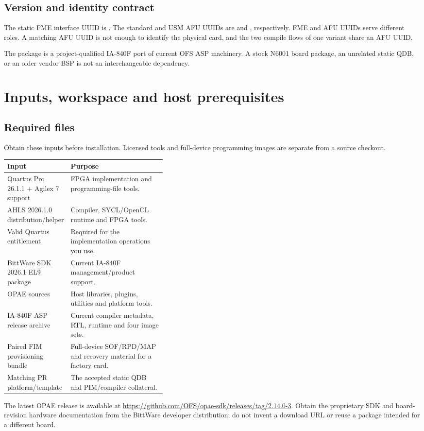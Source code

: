 \documentclass[11pt,letterpaper]{article}
\newcommand{\code}[1]{{\ttfamily\expandafter\seqsplit\expandafter{\detokenize{#1}}}}
\newcommand{\src}[1]{\cite{S#1}}
\newcommand{\chapterstart}[1]{\clearpage\section{#1}}
\begin{document}
\subsection{Version and identity contract}
The static FME interface UUID is
. The standard and USM AFU UUIDs are
 and
, respectively. FME and AFU UUIDs
serve different roles. A matching AFU UUID is not enough to identify the
physical card, and the two compile flows of one variant share an AFU UUID.\src{20}

The package is a project-qualified IA-840F port of current OFS ASP machinery.
A stock N6001 board package, an unrelated static QDB, or an older vendor BSP
is not an interchangeable dependency.\src{20}

\chapterstart{Inputs, workspace and host prerequisites}
\label{sec:paths}
\subsection{Required files}
Obtain these inputs before installation. Licensed tools and full-device
programming images are separate from a source checkout.
\par\noindent\begin{tabularx}{\linewidth}{@{}p{0.38\linewidth}Y@{}}
\toprule
Input & Purpose\\\midrule
Quartus Pro 26.1.1 + Agilex 7 support & FPGA implementation and programming-file tools.\\
AHLS 2026.1.0 distribution/helper & Compiler, SYCL/OpenCL runtime and FPGA tools.\\
Valid Quartus entitlement & Required for the implementation operations you use.\\
BittWare SDK 2026.1 EL9 package & Current IA-840F management/product support.\\
OPAE \code{2.14.0-3} sources & Host libraries, plugins, utilities and platform tools.\\
IA-840F ASP release archive & Current compiler metadata, RTL, runtime and four image sets.\\
Paired FIM provisioning bundle & Full-device SOF/RPD/MAP and recovery material for a factory card.\\
Matching PR platform/template & The accepted static QDB and PIM/compiler collateral.\\
\bottomrule
\end{tabularx}\par
The latest OPAE release is available at
\url{https://github.com/OFS/opae-sdk/releases/tag/2.14.0-3}.\src{17}
Obtain the proprietary SDK and board-revision hardware documentation from the
BittWare developer distribution; do not invent a download URL or reuse a
package intended for a different board.
\end{document}
